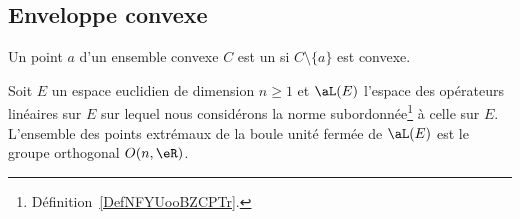 \subsection{Enveloppe convexe}

\begin{definition}
	Un point \( a\) d'un ensemble convexe \( C\) est un  si \( C\setminus \{ a \}\) est convexe.
\end{definition}

\begin{theorem} \label{ThoBALmoQw}
	Soit \( E\) un espace euclidien de dimension \( n\geq 1\) et \( \aL(E)\) l'espace des opérateurs linéaires sur \( E\) sur lequel nous considérons la norme subordonnée\footnote{Définition~\ref{DefNFYUooBZCPTr}.} à celle sur \( E\). L'ensemble des points extrémaux de la boule unité fermée de \( \aL(E)\) est le groupe orthogonal \( O(n,\eR)\).
\end{theorem}

